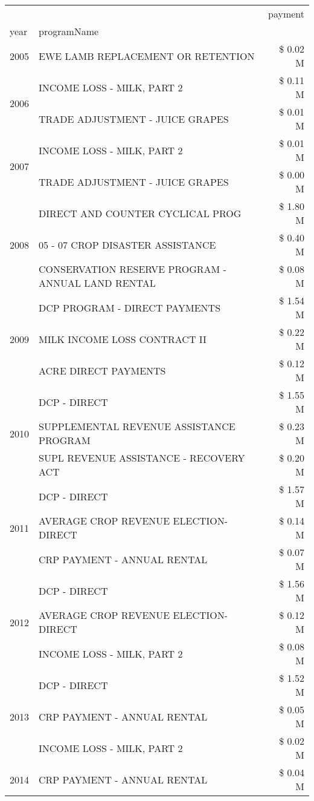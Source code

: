 \begin{tabular}{llr}
\toprule
 &  & payment \\
year & programName &  \\
\midrule
2005 & EWE LAMB REPLACEMENT OR RETENTION & \$ 0.02 M \\
\cline{1-3}
\multirow[t]{2}{*}{2006} & INCOME LOSS - MILK, PART 2 & \$ 0.11 M \\
 & TRADE ADJUSTMENT - JUICE GRAPES & \$ 0.01 M \\
\cline{1-3}
\multirow[t]{2}{*}{2007} & INCOME LOSS - MILK, PART 2 & \$ 0.01 M \\
 & TRADE ADJUSTMENT - JUICE GRAPES & \$ 0.00 M \\
\cline{1-3}
\multirow[t]{3}{*}{2008} & DIRECT AND COUNTER CYCLICAL PROG & \$ 1.80 M \\
 & 05 - 07 CROP DISASTER ASSISTANCE & \$ 0.40 M \\
 & CONSERVATION RESERVE PROGRAM - ANNUAL LAND RENTAL & \$ 0.08 M \\
\cline{1-3}
\multirow[t]{3}{*}{2009} & DCP PROGRAM - DIRECT PAYMENTS & \$ 1.54 M \\
 & MILK INCOME LOSS CONTRACT II & \$ 0.22 M \\
 & ACRE DIRECT PAYMENTS & \$ 0.12 M \\
\cline{1-3}
\multirow[t]{3}{*}{2010} & DCP - DIRECT & \$ 1.55 M \\
 & SUPPLEMENTAL REVENUE ASSISTANCE PROGRAM & \$ 0.23 M \\
 & SUPL REVENUE ASSISTANCE - RECOVERY ACT & \$ 0.20 M \\
\cline{1-3}
\multirow[t]{3}{*}{2011} & DCP - DIRECT & \$ 1.57 M \\
 & AVERAGE CROP REVENUE ELECTION-DIRECT & \$ 0.14 M \\
 & CRP PAYMENT - ANNUAL RENTAL & \$ 0.07 M \\
\cline{1-3}
\multirow[t]{3}{*}{2012} & DCP - DIRECT & \$ 1.56 M \\
 & AVERAGE CROP REVENUE ELECTION-DIRECT & \$ 0.12 M \\
 & INCOME LOSS - MILK, PART 2 & \$ 0.08 M \\
\cline{1-3}
\multirow[t]{3}{*}{2013} & DCP - DIRECT & \$ 1.52 M \\
 & CRP PAYMENT - ANNUAL RENTAL & \$ 0.05 M \\
 & INCOME LOSS - MILK, PART 2 & \$ 0.02 M \\
\cline{1-3}
\multirow[t]{3}{*}{2014} & CRP PAYMENT - ANNUAL RENTAL & \$ 0.04 M \\

\end{tabular}

